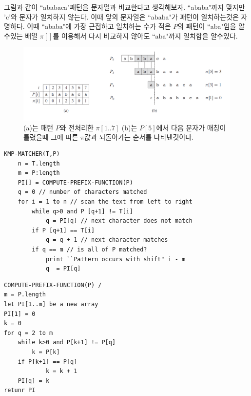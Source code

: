 그림과 같이 ``ababaca"패턴을 문자열과 비교한다고 생각해보자.
``ababa"까지 맞지만 'c'와 문자가 일치하지 않는다. 이때 앞의 문자열은 ``ababa"가 패턴이 일치하는것은 자명하다. 이때 ``ababa"에 가장 근접하고 일치하는 수가 적은 $P$의 패턴이 ``aba"임을 알수있는 배열 $\pi[]$를 이용해서 다시 비교하지 않아도 ``aba"까지 일치함을 알수있다. 


\begin{figure}[h!]
    \centering
    \includegraphics[scale=0.4]{./string_matching/pic4.PNG}
    \caption{(a)는 패턴 $P$와 전처리한 $\pi[1..7]$ (b)는 $P[5]$에서 다음 문자가 매칭이 틀렸을때 그에 따른 $\pi$값과 되돌아가는 순서를 나타낸것이다.}
\end{figure}


\begin{lstlisting}[style = CStyle]
KMP-MATCHER(T,P)
    n = T.length
    m = P:length
    PI[] = COMPUTE-PREFIX-FUNCTION(P)
    q = 0 // number of characters matched
    for i = 1 to n // scan the text from left to right
        while q>0 and P [q+1] != T[i]
            q = PI[q] // next character does not match  
        if P [q+1] == T[i]
            q = q + 1 // next character matches
        if q == m // is all of P matched?
            print ``Pattern occurs with shift" i - m
            q  = PI[q]
\end{lstlisting}



\begin{lstlisting}[style = CStyle]
COMPUTE-PREFIX-FUNCTION(P) /
m = P.length
let PI[1..m] be a new array
PI[1] = 0
k = 0
for q = 2 to m
    while k>0 and P[k+1] != P[q]
        k = P[k]
    if P[k+1] == P[q]
            k = k + 1
    PI[q] = k 
retunr PI
\end{lstlisting}
